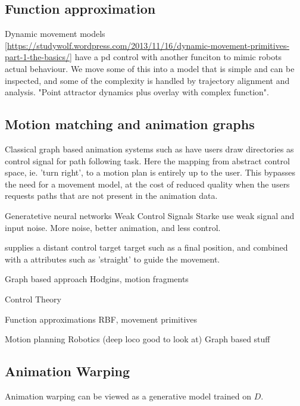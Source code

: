 \subsection{Function approximation}

Dynamic movement models \ref{https://studywolf.wordpress.com/2013/11/16/dynamic-movement-primitives-part-1-the-basics/} have a pd control with another funciton to mimic robots actual behaviour. We move some of this into a model that is simple and can be inspected, and some of the complexity is handled by trajectory alignment and analysis. "Point attractor dynamics plus overlay with complex function".

\subsection{Motion matching and animation graphs}
Classical graph based animation systems such as \citep{treuille07} have users draw directories as control signal for path following task. Here the mapping from abstract control space, ie. 'turn right', to a motion plan is entirely up to the user. This bypasses the need for a movement model, at the cost of reduced quality when the users requests paths that are not present in the animation data.



Generatetive neural networks Weak Control Signals
    Starke use weak signal and input noise. More noise, better animation, and less control.

    \citep{lee18} supplies a distant control target target such as a final position, and combined with a attributes such as 'straight' to guide the movement.

Graph based approach 
    Hodgins, motion fragments

Control Theory

Function approximations 
    RBF, movement primitives

Motion planning
    Robotics (deep loco good to look at)
    Graph based stuff



\subsection{Animation Warping}
Animation warping can be viewed as a generative model trained on $D$. 

